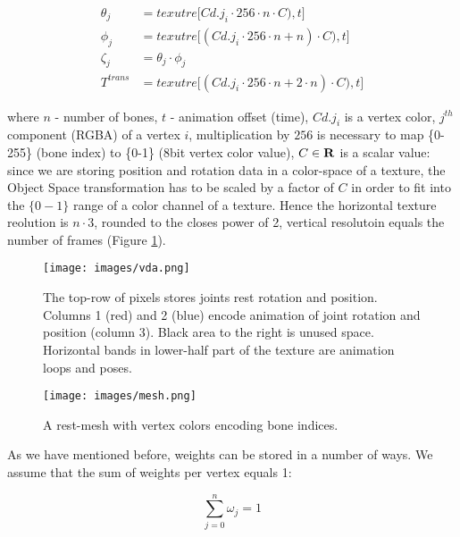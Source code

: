 \documentclass{acmsiggraph}
\begin{document}
\begin{equation}
  \begin{split}
  \theta_j & = texutre \lbrack Cd.j_i \cdot 256 \cdot n \cdot C), t\rbrack              \\
  \phi_j   & = texutre \lbrack (Cd.j_i \cdot 256 \cdot n + n) \cdot C), t\rbrack         \\
  \zeta_j  & = \theta_j \cdot \phi_j                                                    \\
  T^{trans} & = texutre \lbrack (Cd.j_i \cdot 256 \cdot n + 2 \cdot n) \cdot C), t\rbrack
  \end{split}
\end{equation}
  
where $n$ - number of bones, $t$ - animation offset (time), $Cd.j_i$ is a vertex color, $j^{th}$ component (RGBA) of a vertex $i$, multiplication by $256$ is necessary to map \{0-255\} (bone index) to \{0-1\} (8bit vertex color value), $C\in\bold{R}$ is a scalar value: since we are storing position and rotation data in a color-space of a texture, the Object Space transformation has to be scaled by a factor of $C$ in order to fit into the $\{0-1\}$ range of a color channel of a texture.
Hence the horizontal texture reolution is $n \cdot 3$, rounded to the closes power of 2, vertical resolutoin equals the number of frames (Figure \ref{bones_texture}).

\begin{figure}[ht]
  \centering
  \texttt{[image: images/vda.png]}
  \caption{The top-row of pixels stores joints rest rotation and position.  Columns 1 (red) and 2 (blue) encode animation of joint rotation and position (column 3).  Black area to the right is unused space. Horizontal bands in lower-half part of the texture are animation loops and poses.}
  \label{bones_texture}
\end{figure}

\begin{figure}[ht]
  \centering
  \texttt{[image: images/mesh.png]}
  \caption{ A rest-mesh with vertex colors encoding bone indices.}
  \label{mesh_vertex_colors}
\end{figure}

As we have mentioned before, weights can be stored in a number of ways.  We assume that the sum of weights per vertex equals 1:

\begin{equation}
  \sum^n_{j=0} \omega_j = 1
\end{equation}
\end{document}

